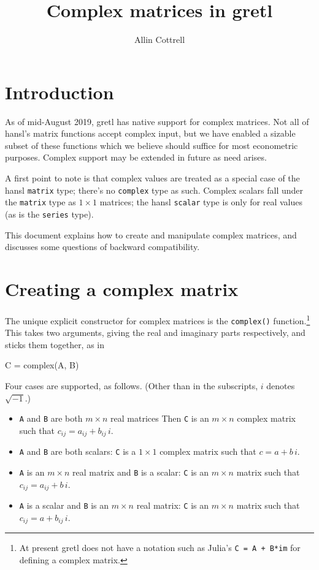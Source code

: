 \documentclass{article}
\begin{document}
\setlength{\parindent}{0pt}
\setlength{\parskip}{1ex}
\setcounter{secnumdepth}{2}

\title{Complex matrices in gretl}
\author{Allin Cottrell}
\maketitle

\section{Introduction}
\label{sec:intro}

As of mid-August 2019, gretl has native support for complex
matrices. Not all of hansl's matrix functions accept complex input,
but we have enabled a sizable subset of these functions which we
believe should suffice for most econometric purposes. Complex support
may be extended in future as need arises.

A first point to note is that complex values are treated as a special
case of the hansl \texttt{matrix} type; there's no \texttt{complex}
type as such. Complex scalars fall under the \texttt{matrix} type as
$1 \times 1$ matrices; the hansl \texttt{scalar} type is only for real
values (as is the \texttt{series} type).

This document explains how to create and manipulate complex matrices,
and discusses some questions of backward compatibility.

\section{Creating a complex matrix}
\label{sec:create}

The unique explicit constructor for complex matrices is the
\texttt{complex()} function.\footnote{At present gretl does not have a
  notation such as Julia's \texttt{C = A + B*im} for defining a
  complex matrix.} This takes two arguments, giving the real and
imaginary parts respectively, and sticks them together, as in
\begin{code}
C = complex(A, B)
\end{code}
Four cases are supported, as follows. (Other than in the subscripts,
$i$ denotes $\sqrt{-1}$.)
\begin{itemize}
\item \texttt{A} and \texttt{B} are both $m \times n$ real matrices
  Then \texttt{C} is an $m \times n$ complex matrix such that
  $c_{ij} = a_{ij} + b_{ij}\,i$.
\item \texttt{A} and \texttt{B} are both scalars: \texttt{C} is a
  $1 \times 1$ complex matrix such that $c = a + b\,i$.
\item \texttt{A} is an $m \times n$ real matrix and \texttt{B} is a
  scalar: \texttt{C} is an $m \times n$ matrix such that
  $c_{ij} = a_{ij} + b\,i$.
\item \texttt{A} is a scalar and \texttt{B} is an $m \times n$ real
  matrix: \texttt{C} is an $m \times n$ matrix such that
  $c_{ij} = a + b_{ij}\,i$.
\end{itemize}
\end{document}

